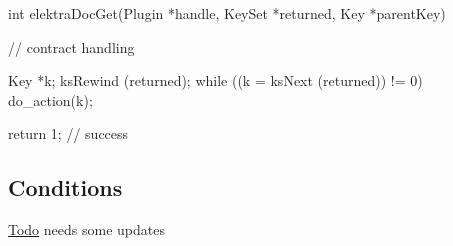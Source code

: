 \begin{DoxyCode}
int elektraDocGet(Plugin *handle, KeySet *returned, Key *parentKey)
{
        // contract handling

        Key *k;
        ksRewind (returned);
        while ((k = ksNext (returned)) != 0)
        {
                do_action(k);
        }

        return 1; // success
}
\end{DoxyCode}
\hypertarget{group__plugin_conditions}{}\subsection{Conditions}\label{group__plugin_conditions}
\begin{Desc}
\item[\hyperlink{todo__todo000002}{Todo}]needs some updates\end{Desc}


